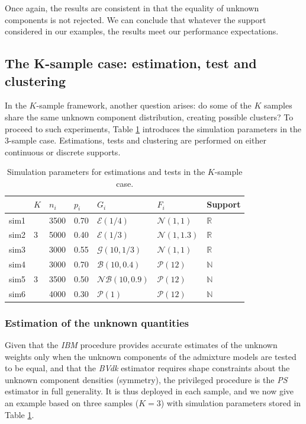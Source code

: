 Once again, the results are consistent in that the equality of unknown components is not rejected. We can conclude that whatever the support considered in our examples, the results meet our performance expectations.

\subsection{The K-sample case: estimation, test and clustering}\label{the-k-sample-case-estimation-test-and-clustering}

In the \(K\)-sample framework, another question arises: do some of the \(K\) samples share the same unknown component distribution, creating possible clusters? To proceed to such experiments, Table \ref{tab:simParamK-latex} introduces the simulation parameters in the 3-sample case. Estimations, tests and clustering are performed on either continuous or discrete supports.

\begin{table}[!h]
\centering
\caption{\label{tab:simParamK-latex}Simulation parameters for estimations and tests in the $K$-sample case.}
\centering
\fontsize{9}{11}\selectfont
\begin{tabular}[t]{lllllll}
\toprule
 & $K$ & $n_i$ & $p_i$ & $G_i$ & $F_i$ & Support\\
\midrule
sim1 &  & 3500 & 0.70 & $\mathcal{E}(1/4)$ & $\mathcal{N}(1,1)$ & $\mathbb{R}$\\
sim2 & 3 & 5000 & 0.40 & $\mathcal{E}(1/3)$ & $\mathcal{N}(1,1.3)$ & $\mathbb{R}$\\
sim3 &  & 3000 & 0.55 & $\mathcal{G}(10,1/3)$ & $\mathcal{N}(1,1)$ & $\mathbb{R}$\\
\midrule
sim4 &  & 3000 & 0.70 & $\mathcal{B}(10,0.4)$ & $\mathcal{P}(12)$ & $\mathbb{N}$\\
sim5 & 3 & 3500 & 0.50 & $\mathcal{NB}(10,0.9)$ & $\mathcal{P}(12)$ & $\mathbb{N}$\\
sim6 &  & 4000 & 0.30 & $\mathcal{P}(1)$ & $\mathcal{P}(12)$ & $\mathbb{N}$\\
\bottomrule
\end{tabular}
\end{table}

\subsubsection{Estimation of the unknown quantities}\label{estimation-of-the-unknown-quantities}

Given that the \emph{IBM} procedure provides accurate estimates of the unknown weights only when the unknown components of the admixture models are tested to be equal, and that the \emph{BVdk} estimator requires shape constraints about the unknown component densities (symmetry), the privileged procedure is the \emph{PS} estimator in full generality. It is thus deployed in each sample, and we now give an example based on three samples (\(K=3\)) with simulation parameters stored in Table \ref{tab:simParamK-latex}.

